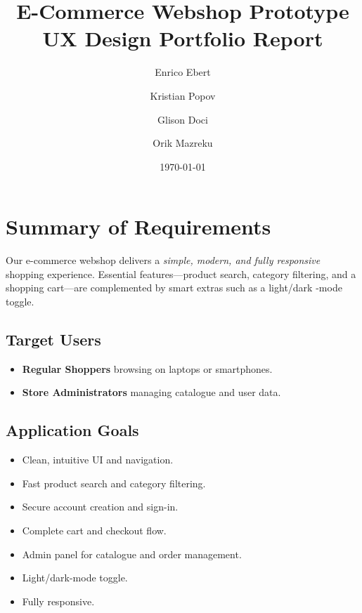 \documentclass[11pt,a4paper]{article}
\begin{document}
	
	\title{\textbf{E-Commerce Webshop Prototype\\UX Design Portfolio Report}}
	\author{Enrico Ebert \and Kristian Popov \and Glison Doci \and Orik Mazreku}
	\date{\today}
	\maketitle
	\thispagestyle{empty}
	\newpage
	
	\setcounter{tocdepth}{2}
	\tableofcontents
	\newpage
	
	\section{Summary of Requirements}\label{sec:project-overview}
	Our e-commerce webshop delivers a \emph{simple, modern, and fully responsive} shopping experience. Essential features—product search, category filtering, and a shopping cart—are complemented by smart extras such as a light/dark
	-mode toggle.
	
	\subsection*{Target Users}
	\begin{itemize}
		\item \textbf{Regular Shoppers} browsing on laptops or smartphones.
		\item \textbf{Store Administrators} managing catalogue and user data.
	\end{itemize}
	
	\subsection*{Application Goals}
	\begin{itemize}
		\item Clean, intuitive UI and navigation.
		\item Fast product search and category filtering.
		\item Secure account creation and sign-in.
		\item Complete cart and checkout flow.
		\item Admin panel for catalogue and order management.
		\item Light/dark-mode toggle.
		\item Fully responsive.

	\end{itemize}
	
\end{document}
